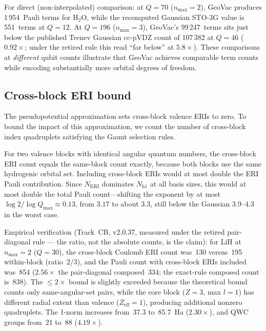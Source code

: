 \documentclass[aps,pra,twocolumn,superscriptaddress,longbibliography]{revtex4-2}
\newcommand{\gvq}[2]{#2}
\begin{document}
For direct (non-interpolated) comparison: at $Q = 70$ ($n_{\max} = 2$),
GeoVac produces \gvq{h2o_composed_pauli}{1\,954}~Pauli terms for H$_2$O, while the recomputed
Gaussian STO-3G value is 551~terms at $Q = 12$.  At $Q = 196$
($n_{\max} = 3$), GeoVac's 99\,247~terms sits just below the
published Trenev Gaussian cc-pVDZ count of \gvq{h2o_ccpvdz_pauli}{107\,382} at $Q = 46$
($0.92\times$; under the retired rule this read ``far below'' at
$5.8\times$).  These
comparisons at \emph{different} qubit counts illustrate that GeoVac
achieves comparable term counts while encoding substantially more
orbital degrees of freedom.


\subsection{Cross-block ERI bound}
\label{sec:cross_block}

The pseudopotential approximation sets cross-block valence ERIs to
zero.  To bound the impact of this approximation, we count the number
of cross-block index quadruplets satisfying the Gaunt selection rules.

For two valence blocks with identical angular quantum numbers, the
cross-block ERI count equals the same-block count exactly, because
both blocks use the same hydrogenic orbital set.  Including
cross-block ERIs would at most double the ERI Pauli contribution.
Since $N_{\mathrm{ERI}}$ dominates $N_{\mathrm{h1}}$ at all basis
sizes, this would at most double the total Pauli count---shifting
the exponent by at most $\log 2 / \log Q_{\max} \approx 0.13$,
from $3.17$ to about $3.3$, still below the Gaussian $3.9$--$4.3$ in the
worst case.

Empirical verification (Track~CB, v2.0.37, measured under the retired
pair-diagonal rule --- the ratio, not the absolute counts, is the
claim): for LiH at $n_{\max}=2$
($Q = 30$), the cross-block Coulomb ERI count was~130 versus~195
within-block (ratio~$2/3$), and the Pauli count with cross-block
ERIs included was~854 ($2.56\times$ the pair-diagonal composed~334;
the exact-rule composed count is~838).  The $\le
2\times$ bound is slightly exceeded because the theoretical bound
counts only same-angular-set pairs, while the core block
($Z = 3$, max $l = 1$) has different radial extent than valence
($Z_{\mathrm{eff}} = 1$), producing additional nonzero quadruplets.
The 1-norm increases from~37.3 to~85.7~Ha ($2.30\times$), and QWC
groups from~21 to~88 ($4.19\times$).
\end{document}
